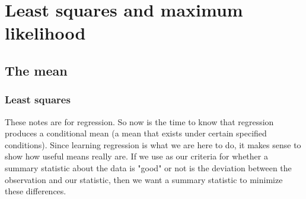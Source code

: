 
\chapter{Least squares and maximum likelihood}
\section{The mean}\label{sec:mean}
\subsection{Least squares}
These notes are for regression. So now is the time to know that regression produces a conditional mean (a mean that exists under certain specified conditions). Since learning regression is what we are here to do, it makes sense to show how useful means really are. If we use as our criteria for whether a summary statistic about the data is "good" or not is the deviation between the observation and our statistic, then we want a summary statistic to minimize these differences.

